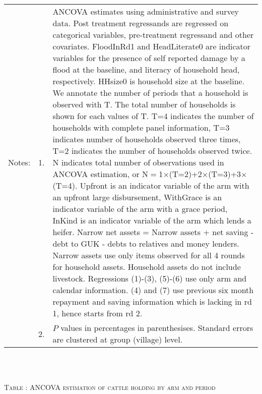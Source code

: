 \begin{minipage}[t]{14cm}
\begin{tabular}{>{\hfill\scriptsize}p{1cm}<{}>{\hfill\scriptsize}p{.25cm}<{}>{\scriptsize}p{12cm}<{\hfill}}
Notes: & 1. & ANCOVA estimates using administrative and survey data. Post treatment regressands are regressed on categorical variables, pre-treatment regressand and other covariates. \textsf{FloodInRd1} and \textsf{HeadLiterate0} are indicator variables for the presence of self reported damage by a flood at the baseline, and literacy of household head, respectively. \textsf{HHsize0} is household size at the baseline. We annotate the number of periods that a household is observed with \textsf{T}. The total number of households is shown for each values of \textsf{T}. \textsf{T=4} indicates the number of households with complete panel information, \textsf{T=3} indicates number of households observed three times, \textsf{T=2} indicates the number of households observed twice. \textsf{N} indicates total number of observations used in ANCOVA estimation, or \textsf{N$=$1$\times$(T=2)+2$\times$(T=3)+3$\times$(T=4)}.  \textsf{Upfront} is an indicator variable of the arm with an upfront large disbursement, \textsf{WithGrace} is an indicator variable of the arm with a grace period, \textsf{InKind} is an indicator variable of the arm which lends a heifer. Narrow net assets = Narrow assets + net saving - debt to GUK - debts to relatives and money lenders. Narrow assets use only items observed for all 4 rounds for household assets. Household assets do not include livestock. Regressions (1)-(3), (5)-(6) use only arm and calendar information. (4) and (7) use previous six month repayment and saving information which is lacking in rd 1, hence starts from rd 2.\\
& 2. &  $P$ values in percentages in parenthesises. Standard errors are clustered at group (village) level. %
 \end{tabular}
\end{minipage} \\\\\hspace{-1cm}\begin{minipage}[t]{14cm} \hfil\textsc{\normalsize Table \thetable: ANCOVA estimation of cattle holding by arm and period\label{tab ANCOVA cow time varying}}\\ \setlength{\tabcolsep}{1pt}
  \setlength{\baselineskip}{8pt}
  \renewcommand{\arraystretch}{.55}
  \hfil{}
\end{minipage}
